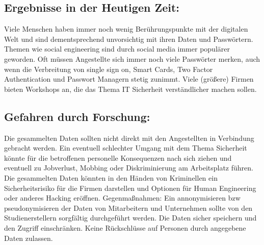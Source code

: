 \subsection{Ergebnisse in der Heutigen Zeit:}
Viele Menschen haben immer noch wenig Berührungspunkte mit der digitalen Welt und sind dementsprechend unvorsichtig mit ihren Daten und Passwörtern. Themen wie social engineering sind durch social media immer populärer geworden. Oft müssen Angestellte sich immer noch viele Passwörter merken, auch wenn die Verbreitung von single sign on, Smart Cards, Two Factor Authentication und Passwort Managern stetig zunimmt. Viele (größere) Firmen bieten Workshops an, die das Thema IT Sicherheit verständlicher machen sollen.

\subsection{Gefahren durch Forschung:}
Die gesammelten Daten sollten nicht direkt mit den Angestellten in Verbindung gebracht werden. Ein eventuell schlechter Umgang mit dem Thema Sicherheit könnte für die betroffenen personelle Konsequenzen nach sich ziehen und eventuell zu Jobverlust, Mobbing oder Diskriminierung am Arbeitsplatz führen. Die gesammelten Daten könnten in den Händen von Kriminellen ein Sicherheitsrisiko für die Firmen darstellen und Optionen für Human Engineering oder anderes Hacking eröffnen. 
Gegenmaßnahmen:
Ein annonymisieren bzw pseudonymisieren der Daten von Mitarbeitern und Unternehmen sollte von den Studienerstellern sorgfältig durchgeführt werden. Die Daten sicher speichern und den Zugriff einschränken. Keine Rückschlüsse auf Personen durch angegebene Daten zulassen.


